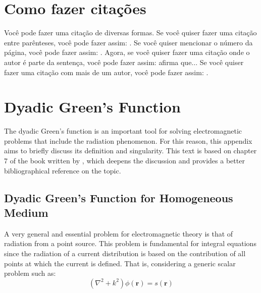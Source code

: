 
	\chapter{Como fazer citações}

		Você pode fazer uma citação de diversas formas. Se você quiser fazer uma citação entre parênteses, você pode fazer assim: \citep{milgram1969note}. Se você quiser mencionar o número da página, você pode fazer assim: \citep[p. 10]{deb2002fast}. Agora, se você quiser fazer uma citação onde o autor é parte da sentença, você pode fazer assim: \cite{maxwell1865viii} afirma que... Se você quiser fazer uma citação com mais de um autor, você pode fazer assim: \citep{van2019fantastic,maxwell1865viii}.

	\chapter{Dyadic Green's Function}\label{app:green}
	
		The dyadic Green's function is an important tool for solving electromagnetic problems that include the radiation phenomenon. For this reason, this appendix aims to briefly discuss its definition and singularity. This text is based on chapter 7 of the book written by \cite{chew1995}, which deepens the discussion and provides a better bibliographical reference on the topic.

		\section{Dyadic Green's Function for Homogeneous Medium}\label{app:green:1}

			A very general and essential problem for electromagnetic theory is that of radiation from a point source. This problem is fundamental for integral equations since the radiation of a current distribution is based on the contribution of all points at which the current is defined. That is, considering a generic scalar problem such as:
			\begin{equation}
				(\nabla^2+k^2)\phi(\mathbf{r}) = s(\mathbf{r}) \label{eq:app:green:1}
			\end{equation}

